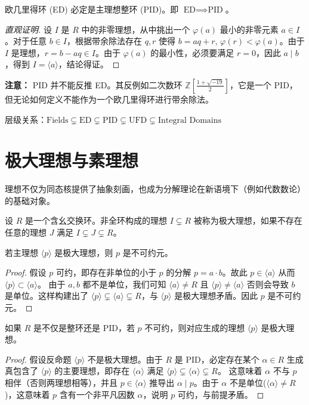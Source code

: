 \documentclass[11pt]{article}
\begin{document}
\begin{cntheorem}
欧几里得环 (ED) 必定是主理想整环 (PID)。即 $\text{ED} \implies \text{PID}$。
\end{cntheorem}
\begin{proof}[直观证明]
设 $I$ 是 $R$ 中的非零理想，从中挑出一个 $\varphi(a)$ 最小的非零元素 $a \in I$。对于任意 $b \in I$，根据带余除法存在 $q,r$ 使得 $b = aq+r$, $\varphi(r)<\varphi(a)$。由于 $I$ 是理想，$r = b - aq \in I$。由于 $\varphi(a)$ 的最小性，必须要满足 $r=0$，因此 $a \mid b$，得到 $I = \langle a \rangle$，结论得证。
\end{proof}
\noindent \textbf{注意：} PID 并不能反推 ED。其反例如二次数环 $\mathbb{Z}\left[\frac{1+\sqrt{-19}}{2}\right]$，它是一个 PID，但无论如何定义不能作为一个欧几里得环进行带余除法。

层级关系：$\text{Fields} \subsetneq \text{ED} \subsetneq \text{PID} \subsetneq \text{UFD} \subsetneq \text{Integral Domains}$

\section{极大理想与素理想}
理想不仅为同态核提供了抽象刻画，也成为分解理论在新语境下（例如代数数论）的基础对象。
\begin{cndefinition}[极大理想]
设 $R$ 是一个含幺交换环。非全环构成的理想 $I \subsetneq R$ 被称为极大理想，如果不存在任意的理想 $J$ 满足 $I \subsetneq J \subsetneq R$。
\end{cndefinition}

\begin{cnproperty}
若主理想 $\langle p \rangle$ 是极大理想，则 $p$ 是不可约元。
\end{cnproperty}
\begin{proof}
假设 $p$ 可约，即存在非单位的小于 $p$ 的分解 $p=a \cdot b$。故此 $p \in \langle a \rangle$ 从而 $\langle p \rangle \subset \langle a \rangle$。
由于 $a, b$ 都不是单位，我们可知 $\langle a \rangle \neq R$ 且 $\langle p \rangle \neq \langle a \rangle$ 否则会导致 $b$ 是单位。这样构建出了 $\langle p \rangle \subsetneq \langle a \rangle \subsetneq R$，与 $\langle p \rangle$ 是极大理想矛盾。因此 $p$ 是不可约元。
\end{proof}

\begin{cnproperty}
如果 $R$ 是不仅是整环还是 PID，若 $p$ 不可约，则对应生成的理想 $\langle p \rangle$ 是极大理想。
\end{cnproperty}
\begin{proof}
假设反命题 $\langle p \rangle$ 不是极大理想。由于 $R$ 是 PID，必定存在某个 $\alpha \in R$ 生成真包含了 $\langle p \rangle$ 的主要理想，即存在 $\langle \alpha \rangle$ 满足 $\langle p \rangle \subsetneq \langle \alpha \rangle \subsetneq R$。
这意味着 $\alpha$ 不与 $p$ 相伴（否则两理想相等），并且 $p \in \langle \alpha \rangle$ 推导出 $\alpha \mid p$。由于 $\alpha$ 不是单位($\langle \alpha\rangle \neq R$)，这意味着 $p$ 含有一个非平凡因数 $\alpha$，说明 $p$ 可约，与前提矛盾。
\end{proof}
\end{document}
